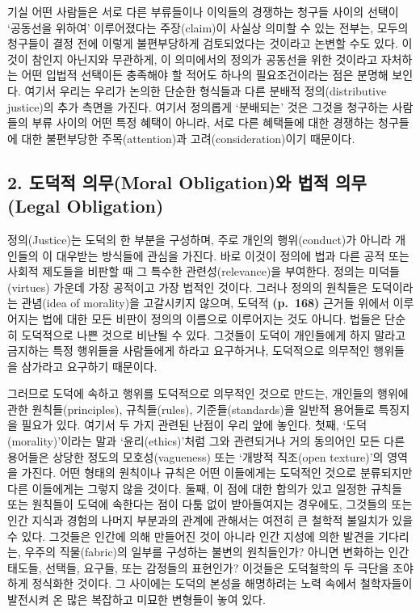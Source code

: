 기실 어떤 사람들은 서로 다른 부류들이나 이익들의 경쟁하는 청구들 사이의
선택이 ‘공동선을 위하여’ 이루어졌다는 주장(claim)이 사실상 의미할 수
있는 전부는, 모두의 청구들이 결정 전에 이렇게 불편부당하게 검토되었다는
것이라고 논변할 수도 있다. 이것이 참인지 아닌지와 무관하게, 이
의미에서의 정의가 공동선을 위한 것이라고 자처하는 어떤 입법적 선택이든
충족해야 할 적어도 하나의 필요조건이라는 점은 분명해 보인다. 여기서
우리는 우리가 논의한 단순한 형식들과 다른 분배적 정의(distributive
justice)의 추가 측면을 가진다. 여기서 정의롭게 ‘분배되는’ 것은 그것을
청구하는 사람들의 부류 사이의 어떤 특정 혜택이 아니라, 서로 다른
혜택들에 대한 경쟁하는 청구들에 대한 불편부당한 주목(attention)과
고려(consideration)이기 때문이다.

\subsection{2. 도덕적 의무(Moral Obligation)와 법적 의무(Legal
Obligation)}\label{uxb3c4uxb355uxc801-uxc758uxbb34moral-obligationuxc640-uxbc95uxc801-uxc758uxbb34legal-obligation}

정의(Justice)는 도덕의 한 부분을 구성하며, 주로 개인의 행위(conduct)가
아니라 개인들의 이 대우받는 방식들에 관심을
가진다. 바로 이것이 정의에 법과 다른 공적 또는 사회적 제도들을 비판할 때
그 특수한 관련성(relevance)을 부여한다. 정의는 미덕들(virtues) 가운데
가장 공적이고 가장 법적인 것이다. 그러나 정의의 원칙들은 도덕이라는
관념(idea of morality)을 고갈시키지 않으며, 도덕적 \textbf{(p.~168)}
근거들 위에서 이루어지는 법에 대한 모든 비판이 정의의 이름으로
이루어지는 것도 아니다. 법들은 단순히 도덕적으로 나쁜 것으로 비난될 수
있다. 그것들이 도덕이 개인들에게 하지 말라고 금지하는 특정 행위들을
사람들에게 하라고 요구하거나, 도덕적으로 의무적인 행위들을 삼가라고
요구하기 때문이다.

그러므로 도덕에 속하고 행위를 도덕적으로 의무적인 것으로 만드는,
개인들의 행위에 관한 원칙들(principles), 규칙들(rules),
기준들(standards)을 일반적 용어들로 특징지을 필요가 있다. 여기서 두 가지
관련된 난점이 우리 앞에 놓인다. 첫째, ‘도덕(morality)’이라는 말과
‘윤리(ethics)’처럼 그와 관련되거나 거의 동의어인 모든 다른 용어들은
상당한 정도의 모호성(vagueness) 또는 ‘개방적 직조(open texture)’의
영역을 가진다. 어떤 형태의 원칙이나 규칙은 어떤 이들에게는 도덕적인
것으로 분류되지만 다른 이들에게는 그렇지 않을 것이다. 둘째, 이 점에 대한
합의가 있고 일정한 규칙들 또는 원칙들이 도덕에 속한다는 점이 다툼 없이
받아들여지는 경우에도, 그것들의  또는 인간 지식과
경험의 나머지 부분과의 관계에 관해서는 여전히 큰 철학적 불일치가 있을 수
있다. 그것들은 인간에 의해 만들어진 것이 아니라 인간 지성에 의한 발견을
기다리는, 우주의 직물(fabric)의 일부를 구성하는 불변의 원칙들인가?
아니면 변화하는 인간 태도들, 선택들, 요구들, 또는 감정들의 표현인가?
이것들은 도덕철학의 두 극단을 조야하게 정식화한 것이다. 그 사이에는
도덕의 본성을 해명하려는 노력 속에서 철학자들이 발전시켜 온 많은
복잡하고 미묘한 변형들이 놓여 있다.

